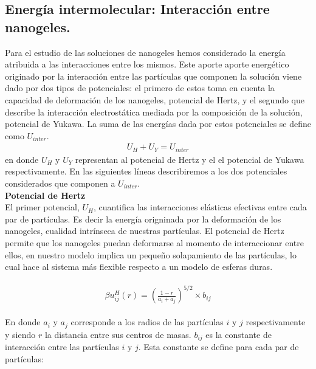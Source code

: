 	\subsection{Energ\'ia intermolecular: Interacci\'on entre nanogeles.}\label{sec:mc:energia_intra}
	
	Para el estudio de las soluciones de nanogeles hemos considerado la energ\'ia atribuida a las interacciones entre los mismos. Este aporte aporte energ\'etico originado por la interacci\'on entre las part\'iculas que componen la soluci\'on viene dado por dos tipos de potenciales: el primero de estos toma en cuenta la capacidad de deformaci\'on de los nanogeles, potencial de Hertz, y el segundo que describe la interacción electrost\'atica mediada por la composici\'on de la soluci\'on, potencial de Yukawa.
	La suma de las energ\'ias dada por estos potenciales se define como $U_{inter}$.
	\begin{align}
		U_H + U_Y = U_{inter}
		\label{eq:mc:u_inter}
	\end{align}
	\noindent en donde $U_H$ y $U_Y$ representan al potencial de Hertz y el el potencial de Yukawa respectivamente.
	En las siguientes líneas describiremos a los dos potenciales considerados que componen a $U_{inter}$.\\
	
	\textbf{Potencial de Hertz} \\
	
	El primer potencial, $U_H$, cuantifica las interacciones el\'asticas efectivas entre cada par de part\'iculas. Es decir la energ\'ia origninada por la deformaci\'on de los nanogeles, cualidad intr\'inseca de nuestras part\'iculas.  El potencial de Hertz permite que los nanogeles puedan deformarse al momento de interaccionar entre ellos, en nuestro modelo implica un peque\~no solapamiento de las part\'iculas, lo cual hace al sistema m\'as flexible respecto a un modelo de esferas duras. 
	
	\begin{align}
		\begin{aligned}
			\beta u^H_{ij} (r) = \left(\frac{1-r}{a_i + a_j}\right)^{5/2}\times b_{ij}
		\end{aligned}
		\label{eq:mc:hertz_ij}
	\end{align}
	
	\noindent En donde $a_i$ y $a_j$ corresponde a los radios de las part\'iculas $i$ y $j$ respectivamente y siendo $r$ la distancia entre sus centros de masas. $b_{ij}$ es la constante de interacci\'on entre las part\'iculas $i$ y $j$. Esta constante se define para cada par de part\'iculas:
	
